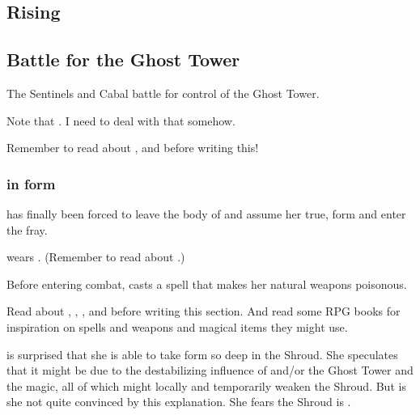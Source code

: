\begin{garbage}
\section{\Nithdornazsh{} Rising}







\subsection{Battle for the Ghost Tower}
The Sentinels and Cabal battle for control of the Ghost Tower. 

Note that . 
I need to deal with that somehow. 

Remember to read about \hs{\dragons}, \hs{\resphain} and \hs{\umbrae} before writing this! 





\subsubsection{\Nzessuacrith{} in \draconic{} form}
\Nzessuacrith{} has finally been forced to leave the body of \Takestsha{} and assume her true, \draconic{} form and enter the fray. 

\Nzessuacrith{} wears . 
(Remember to read about .)

Before entering combat, \Nzessuacrith{} casts a spell that makes her natural weapons poisonous. 

Read about \hs{\Nzessuacrith}, \hs{\Achsah}, \hs{\dragons}, \hs{\resphain} and \hs{\umbrae} before writing this section. 
And read some RPG books for inspiration on spells and weapons and magical items they might use. 

\Nzessuacrith{} is surprised that she is able to take \draconic{} form so deep in the Shroud. 
She speculates that it might be due to the destabilizing influence of \Nithdornazsh{} and/or the Ghost Tower and the \EreshKali{} magic, all of which might locally and temporarily weaken the Shroud. 
But is she not quite convinced by this explanation. 
She fears the Shroud is . 

\begin{prose}
\end{prose}
\end{garbage}
